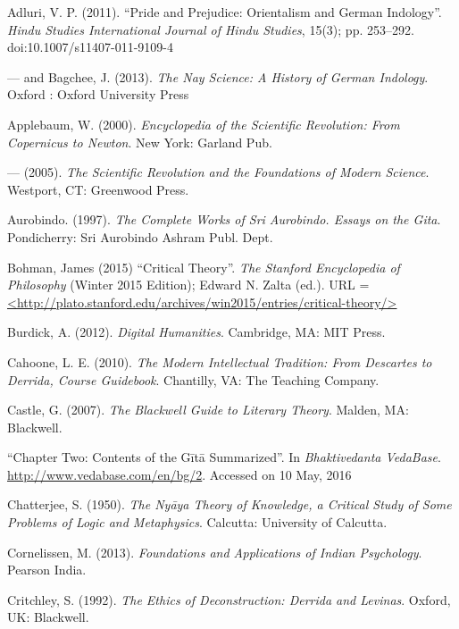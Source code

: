 \begin{thebibliography}{99}
\itemsep=2pt
Adluri, V. P. (2011). ``Pride and Prejudice: Orientalism and German Indology''. {\sl Hindu Studies International Journal of Hindu Studies}, 15(3); pp. 253--292. doi:10.1007/s11407-011-9109-4

--- and Bagchee, J. (2013). {\sl The Nay Science: A History of German Indology}. 
Oxford : Oxford University Press

Applebaum, W. (2000). {\sl Encyclopedia of the Scientific Revolution: From Copernicus to Newton}. New York: Garland Pub.

--- (2005). {\sl The Scientific Revolution and the Foundations of Modern Science}. Westport, CT: Greenwood Press.

Aurobindo. (1997). {\sl The Complete Works of Sri Aurobindo. Essays on the Gita}. Pondicherry: Sri Aurobindo Ashram Publ. Dept.

Bohman, James (2015) ``Critical Theory''. {\sl The Stanford Encyclopedia of Philosophy} (Winter 2015 Edition); Edward N. Zalta (ed.). URL = \url{<http://plato.stanford.edu/archives/win2015/entries/critical-theory/>}

Burdick, A. (2012). {\sl Digital Humanities}. Cambridge, MA: MIT Press.

Cahoone, L. E. (2010). {\sl The Modern Intellectual Tradition: From Descartes to Derrida, Course Guidebook}. Chantilly, VA: The Teaching Company.

Castle, G. (2007). {\sl The Blackwell Guide to Literary Theory}. Malden, MA: Blackwell.

``Chapter Two: Contents of the Gītā Summarized''. In {\sl Bhaktivedanta VedaBase}. \url{http://www.vedabase.com/en/bg/2}. Accessed on 10 May, 2016

Chatterjee, S. (1950). {\sl The Nyāya Theory of Knowledge, a Critical Study of Some Problems of Logic and Metaphysics}. Calcutta: University of Calcutta.

Cornelissen, M. (2013). {\sl Foundations and Applications of Indian Psychology}. Pearson India.

Critchley, S. (1992). {\sl The Ethics of Deconstruction: Derrida and Levinas}. Oxford, UK: Blackwell.


\end{thebibliography}
